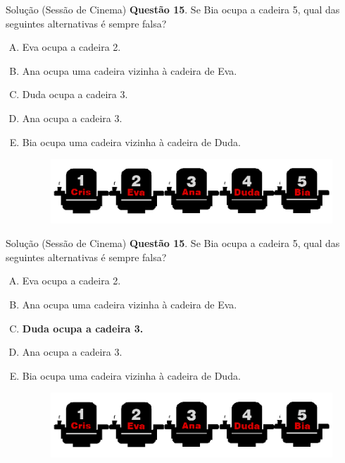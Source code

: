 \documentclass{beamer}
\begin{document}
\begin{frame}{Solução (Sessão de Cinema)}
\textbf{Questão 15}. Se Bia ocupa a cadeira 5, qual das seguintes alternativas é sempre falsa?

\begin{enumerate}[(A)]
    \item Eva ocupa a cadeira 2.
    \item Ana ocupa uma cadeira vizinha à cadeira de Eva.
    \item Duda ocupa a cadeira 3.
    \item Ana ocupa a cadeira 3.
    \item Bia ocupa uma cadeira vizinha à cadeira de Duda.

        \begin{figure}[ht]
        \centering
        \includegraphics[width=.8\textwidth]{nomes9.png}
        \label{fig:exampleFig2}
        \end{figure}
        
\end{enumerate}
\end{frame}
\begin{frame}{Solução (Sessão de Cinema)}
\textbf{Questão 15}. Se Bia ocupa a cadeira 5, qual das seguintes alternativas é sempre falsa?

\begin{enumerate}[(A)]
    \item Eva ocupa a cadeira 2.
    \item Ana ocupa uma cadeira vizinha à cadeira de Eva.
    \item \textbf{Duda ocupa a cadeira 3.}
    \item Ana ocupa a cadeira 3.
    \item Bia ocupa uma cadeira vizinha à cadeira de Duda.

        \begin{figure}[ht]
        \centering
        \includegraphics[width=.8\textwidth]{nomes9.png}
        \label{fig:exampleFig2}
        \end{figure}
        
\end{enumerate}
\end{frame}

\end{document}
